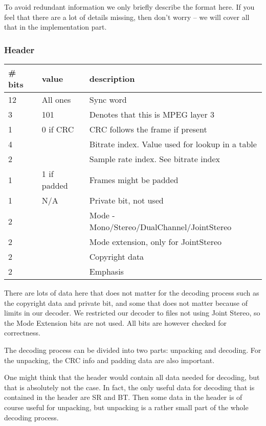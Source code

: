 \documentclass[a4paper,12pt]{article}
\begin{document}
       To avoid redundant information we only briefly describe the format here.
       If you feel that there are a lot of details missing, then don't worry --
       we will cover all that in the implementation part.

       \subsubsection{Header}
       \label{sec:header}
        \begin{tabular}{l l l}
            \# bits & value & description \\ \hline
            12  & All ones    & Sync word \\
            3   & 101         & Denotes that this is MPEG layer 3 \\
            1   & 0 if CRC    & CRC follows the frame if present \\
            4   &             & Bitrate index. Value used for lookup in a table \\
            2   &             & Sample rate index. See bitrate index \\
            1   & 1 if padded & Frames might be padded \\
            1   & N/A         & Private bit, not used \\
            2   &             & Mode - Mono/Stereo/DualChannel/JointStereo \\
            2   &             & Mode extension, only for JointStereo \\
            2   &             & Copyright data \\
            2   &             & Emphasis
        \end{tabular}

            There are lots of data here that does not matter for the decoding
            process such as the copyright data and private bit, and
            some that does not matter because of limits in our
            decoder. We restricted our decoder to files not using Joint Stereo,
            so the Mode Extension bits are not used. All bits are however
            checked for correctness.

            The decoding process can be divided into two parts: unpacking and
            decoding. For the unpacking, the CRC info and padding data are also
            important.

            One might think that the header would contain all data needed for
            decoding, but that is absolutely not the case. In fact, the only
            useful data for decoding that is contained in the header are SR and
            BT. Then some data in the header is of course useful for unpacking,
            but unpacking is a rather small part of the whole decoding process.
\end{document}
